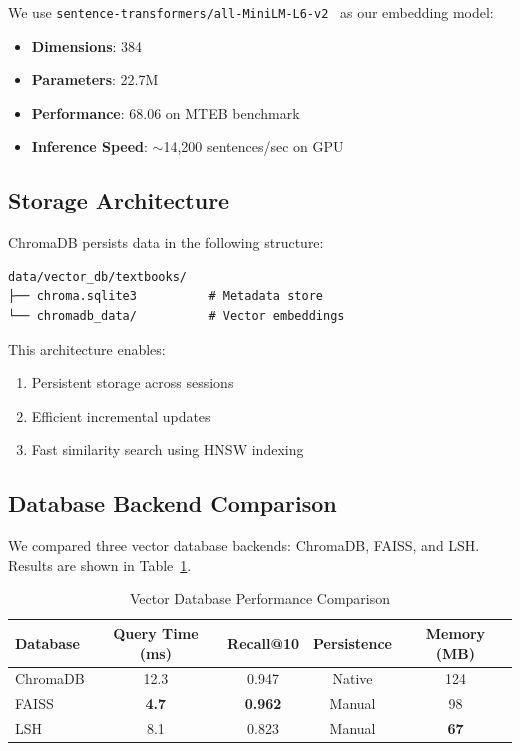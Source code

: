 \documentclass[11pt,a4paper]{article}
\begin{document}
We use \texttt{sentence-transformers/all-MiniLM-L6-v2}~\cite{reimers2019sentence} as our embedding model:
\begin{itemize}
    \item \textbf{Dimensions}: 384
    \item \textbf{Parameters}: 22.7M
    \item \textbf{Performance}: 68.06 on MTEB benchmark
    \item \textbf{Inference Speed}: $\sim$14,200 sentences/sec on GPU
\end{itemize}

\subsection{Storage Architecture}

ChromaDB persists data in the following structure:
\begin{verbatim}
data/vector_db/textbooks/
├── chroma.sqlite3          # Metadata store
└── chromadb_data/          # Vector embeddings
\end{verbatim}

This architecture enables:
\begin{enumerate}
    \item Persistent storage across sessions
    \item Efficient incremental updates
    \item Fast similarity search using HNSW indexing~\cite{malkov2018efficient}
\end{enumerate}

\subsection{Database Backend Comparison}

We compared three vector database backends: ChromaDB, FAISS, and LSH. Results are shown in Table~\ref{tab:db_comparison}.

\begin{table}[H]
\centering
\begin{tabular}{lcccc}
\toprule
\textbf{Database} & \textbf{Query Time (ms)} & \textbf{Recall@10} & \textbf{Persistence} & \textbf{Memory (MB)} \\
\midrule
ChromaDB & 12.3 & 0.947 & Native & 124 \\
FAISS & \textbf{4.7} & \textbf{0.962} & Manual & 98 \\
LSH & 8.1 & 0.823 & Manual & \textbf{67} \\
\bottomrule
\end{tabular}
\caption{Vector Database Performance Comparison}
\label{tab:db_comparison}
\end{table}
\end{document}

